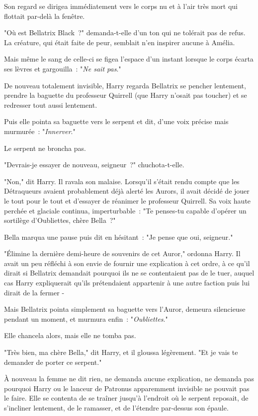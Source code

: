 Son regard se dirigea immédiatement vers le corps nu et à l'air très mort qui flottait par-delà la fenêtre.

"Où est Bellatrix Black~?" demanda-t-elle d'un ton qui ne tolérait pas de refus. La créature, qui était faite de peur, semblait n'en inspirer aucune à Amélia.

Mais même le sang de celle-ci se figea l'espace d'un instant lorsque le corps écarta ses lèvres et gargouilla~: "\emph{Ne sait pas}."

\later

De nouveau totalement invisible, Harry regarda Bellatrix se pencher lentement, prendre la baguette du professeur Quirrell (que Harry n'osait pas toucher) et se redresser tout aussi lentement.

Puis elle pointa sa baguette vers le serpent et dit, d'une voix précise mais murmurée~: "\emph{Innerver}."

Le serpent ne broncha pas.

"Devrais-je essayer de nouveau, seigneur~?" chuchota-t-elle.

"Non," dit Harry. Il ravala son malaise. Lorsqu'il s'était rendu compte que les Détraqueurs avaient probablement déjà alerté les Aurors, il avait décidé de jouer le tout pour le tout et d'essayer de réanimer le professeur Quirrell. Sa voix haute perchée et glaciale continua, imperturbable~: "Te penses-tu capable d'opérer un sortilège d'Oubliettes, chère Bella~?"

Bella marqua une pause puis dit en hésitant~: "Je pense que oui, seigneur."

"Élimine la dernière demi-heure de souvenirs de cet Auror," ordonna Harry. Il avait un peu réfléchi à son envie de fournir une explication à cet ordre, à ce qu'il dirait si Bellatrix demandait pourquoi ils ne se contentaient pas de le tuer, auquel cas Harry expliquerait qu'ils prétendaient appartenir à une autre faction puis lui dirait de la fermer -

Mais Bellatrix pointa simplement sa baguette vers l'Auror, demeura silencieuse pendant un moment, et murmura enfin~: "\emph{Oubliettes}."

Elle chancela alors, mais elle ne tomba pas.

"Très bien, ma chère Bella," dit Harry, et il gloussa légèrement. "Et je vais te demander de porter ce serpent."

À nouveau la femme ne dit rien, ne demanda aucune explication, ne demanda pas pourquoi Harry ou le lanceur de Patronus apparemment invisible ne pouvait pas le faire. Elle se contenta de se traîner jusqu'à l'endroit où le serpent reposait, de s'incliner lentement, de le ramasser, et de l'étendre par-dessus son épaule.

